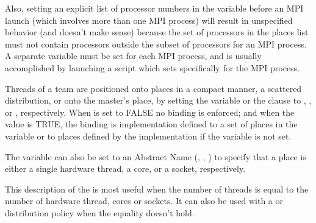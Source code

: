 Also, setting an explicit list of processor numbers in the  
variable before an MPI launch (which involves more than one MPI process) will
result in unspecified behavior (and doesn't make sense) because the set of 
processors in the places list must not contain processors outside the subset 
of processors for an MPI process. A separate  variable must
be set for each MPI process, and is usually accomplished by launching a script 
which sets  specifically for the MPI process. 

Threads of a team are positioned onto places in a compact manner, a 
scattered distribution, or onto the master's place, by setting the 
 variable or the  clause  to 
, , or , respectively.  When 
 is set to FALSE no binding is enforced; and 
when the value is TRUE, the binding is implementation defined to 
a set of places in the  variable or to places 
defined by the implementation if the  variable 
is not set.

The  variable can also be set to an Abstract Name 
(, , ) to specify that a place is
either a single hardware thread, a core, or a socket, respectively. 

This description of the  is most useful when the 
number of threads is equal to the number of hardware thread, cores
or sockets.  It can also be used with a  or  
distribution policy when the equality doesn't hold.




%   
%     

%   
%    
%     

